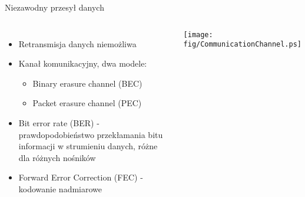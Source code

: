 \documentclass[compress,red]{beamer}
\begin{document}
\begin{frame}{Niezawodny przesył danych}

  \begin{columns}[c]

      \begin{itemize}
	\item Retransmisja danych niemożliwa
	\item Kanał komunikacyjny, dwa modele:
	\begin{itemize}
	  \item Binary erasure channel (BEC)
	  \item Packet erasure channel (PEC)
	\end{itemize}
	\item Bit error rate (BER) - prawdopodobieństwo przekłamania bitu informacji w strumieniu danych, 
	      różne dla różnych nośników
	\item Forward Error Correction (FEC) - kodowanie nadmiarowe
      \end{itemize}

      \vspace{2cm}


      \begin{center}
      \texttt{[image: fig/CommunicationChannel.ps]}
      \end{center}

      \vspace{2cm}

  \end{columns}

\end{frame}
\end{document}
